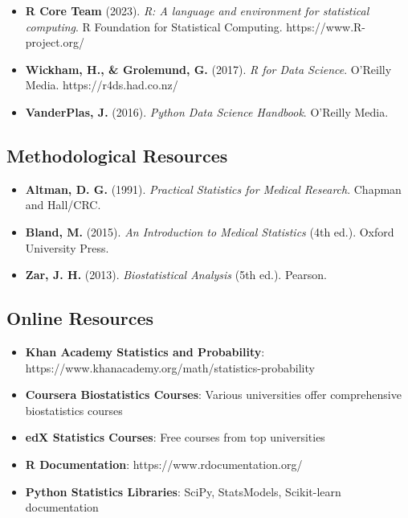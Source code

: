 \documentclass[
  11pt,
  letterpaper,
  oneside]{book}
\providecommand{\tightlist}{%
  \setlength{\itemsep}{0pt}\setlength{\parskip}{0pt}}\usepackage{longtable,booktabs,array}
\begin{document}
\begin{itemize}
\tightlist
\item
  \textbf{R Core Team} (2023). \emph{R: A language and environment for
  statistical computing}. R Foundation for Statistical Computing.
  https://www.R-project.org/
\item
  \textbf{Wickham, H., \& Grolemund, G.} (2017). \emph{R for Data
  Science}. O'Reilly Media. https://r4ds.had.co.nz/
\item
  \textbf{VanderPlas, J.} (2016). \emph{Python Data Science Handbook}.
  O'Reilly Media.
\end{itemize}

\subsection*{Methodological Resources}\label{methodological-resources}

\begin{itemize}
\tightlist
\item
  \textbf{Altman, D. G.} (1991). \emph{Practical Statistics for Medical
  Research}. Chapman and Hall/CRC.
\item
  \textbf{Bland, M.} (2015). \emph{An Introduction to Medical
  Statistics} (4th ed.). Oxford University Press.
\item
  \textbf{Zar, J. H.} (2013). \emph{Biostatistical Analysis} (5th ed.).
  Pearson.
\end{itemize}

\subsection*{Online Resources}\label{online-resources}

\begin{itemize}
\tightlist
\item
  \textbf{Khan Academy Statistics and Probability}:
  https://www.khanacademy.org/math/statistics-probability
\item
  \textbf{Coursera Biostatistics Courses}: Various universities offer
  comprehensive biostatistics courses
\item
  \textbf{edX Statistics Courses}: Free courses from top universities
\item
  \textbf{R Documentation}: https://www.rdocumentation.org/
\item
  \textbf{Python Statistics Libraries}: SciPy, StatsModels, Scikit-learn
  documentation
\end{itemize}


\backmatter
\end{document}
